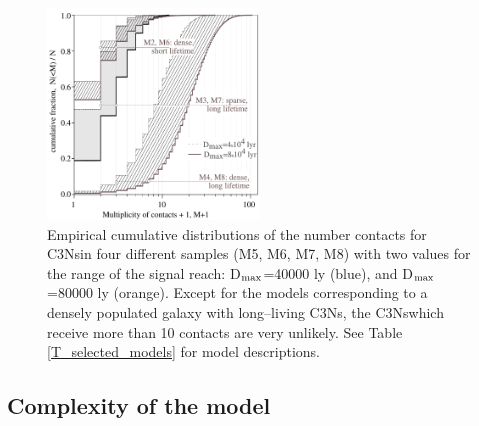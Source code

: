 \documentclass[crop]{CSLB}
\newcommand{\cetis}{C3Ns}
\begin{document}
 
 
\begin{figure} \centering
   \includegraphics[width=0.5\textwidth]{F_number_of_contacts.pdf}
   \caption{
Empirical cumulative distributions of the number contacts
for \cetis in four different samples (M5, M6, M7, M8) with two
values for the range of the signal reach: D$_{\rm max}$=40000 ly (blue),  and 
D$_{\rm max}$=80000 ly (orange).
%
Except for the models corresponding to a densely populated galaxy with
long--living \cetis, the \cetis which receive more than 10 contacts
are very unlikely.
%
See Table \ref{T_selected_models} for model descriptions.
%
   } \label{F_number_of_contacts}
\end{figure}
        
 

\subsection{Complexity of the model}
\end{document}
